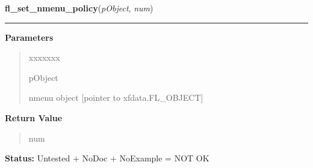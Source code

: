 \hspace{.8\funcindent}\begin{boxedminipage}{\funcwidth}

    \raggedright \textbf{fl\_set\_nmenu\_policy}(\textit{pObject}, \textit{num})

    \vspace{-1.5ex}

    \rule{\textwidth}{0.5\fboxrule}
\setlength{\parskip}{2ex}
\setlength{\parskip}{1ex}
      \textbf{Parameters}
      \vspace{-1ex}

      \begin{quote}
        \begin{Ventry}{xxxxxxx}

          \item[pObject]

          nmenu object [pointer to xfdata.FL\_OBJECT]

        \end{Ventry}

      \end{quote}

      \textbf{Return Value}
    \vspace{-1ex}

      \begin{quote}
      num

      \end{quote}

\textbf{Status:} Untested + NoDoc + NoExample = NOT OK



    \end{boxedminipage}

    \label{xformslib:library:fl_set_nmenu_hl_text_color}

    \vspace{0.5ex}

